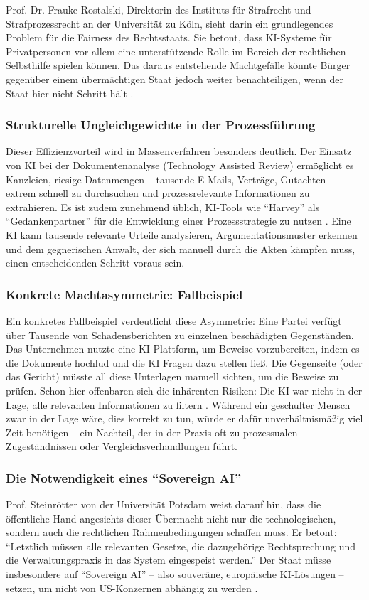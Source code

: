 \documentclass[12pt,a4paper]{article}
\begin{document}
	Prof. Dr. Frauke Rostalski, Direktorin des Instituts für Strafrecht und Strafprozessrecht an der Universität zu Köln, sieht darin ein grundlegendes Problem für die Fairness des Rechtsstaats. Sie betont, dass KI-Systeme für Privatpersonen vor allem eine unterstützende Rolle im Bereich der rechtlichen Selbsthilfe spielen können. Das daraus entstehende Machtgefälle könnte Bürger gegenüber einem übermächtigen Staat jedoch weiter benachteiligen, wenn der Staat hier nicht Schritt hält \cite{Rostalski2024}.
	
	\subsubsection{Strukturelle Ungleichgewichte in der Prozessführung}
	Dieser Effizienzvorteil wird in Massenverfahren besonders deutlich. Der Einsatz von KI bei der Dokumentenanalyse (Technology Assisted Review) ermöglicht es Kanzleien, riesige Datenmengen – tausende E-Mails, Verträge, Gutachten – extrem schnell zu durchsuchen und prozessrelevante Informationen zu extrahieren. Es ist zudem zunehmend üblich, KI-Tools wie \enquote{Harvey} als \enquote{Gedankenpartner} für die Entwicklung einer Prozessstrategie zu nutzen \cite{Hengeler2025}. Eine KI kann tausende relevante Urteile analysieren, Argumentationsmuster erkennen und dem gegnerischen Anwalt, der sich manuell durch die Akten kämpfen muss, einen entscheidenden Schritt voraus sein.
	
	\subsubsection{Konkrete Machtasymmetrie: Fallbeispiel}
	Ein konkretes Fallbeispiel verdeutlicht diese Asymmetrie: Eine Partei verfügt über Tausende von Schadensberichten zu einzelnen beschädigten Gegenständen. Das Unternehmen nutzte eine KI-Plattform, um Beweise vorzubereiten, indem es die Dokumente hochlud und die KI Fragen dazu stellen ließ. Die Gegenseite (oder das Gericht) müsste all diese Unterlagen manuell sichten, um die Beweise zu prüfen. Schon hier offenbaren sich die inhärenten Risiken: Die KI war nicht in der Lage, alle relevanten Informationen zu filtern \cite{Luther2026}. Während ein geschulter Mensch zwar in der Lage wäre, dies korrekt zu tun, würde er dafür unverhältnismäßig viel Zeit benötigen – ein Nachteil, der in der Praxis oft zu prozessualen Zugeständnissen oder Vergleichsverhandlungen führt.
	
	\subsubsection{Die Notwendigkeit eines \enquote{Sovereign AI}}
	Prof. Steinrötter von der Universität Potsdam weist darauf hin, dass die öffentliche Hand angesichts dieser Übermacht nicht nur die technologischen, sondern auch die rechtlichen Rahmenbedingungen schaffen muss. Er betont: \enquote{Letztlich müssen alle relevanten Gesetze, die dazugehörige Rechtsprechung und die Verwaltungspraxis in das System eingespeist werden.} Der Staat müsse insbesondere auf \enquote{Sovereign AI} – also souveräne, europäische KI-Lösungen – setzen, um nicht von US-Konzernen abhängig zu werden \cite{Steinroetter2026}.
	
\end{document}
